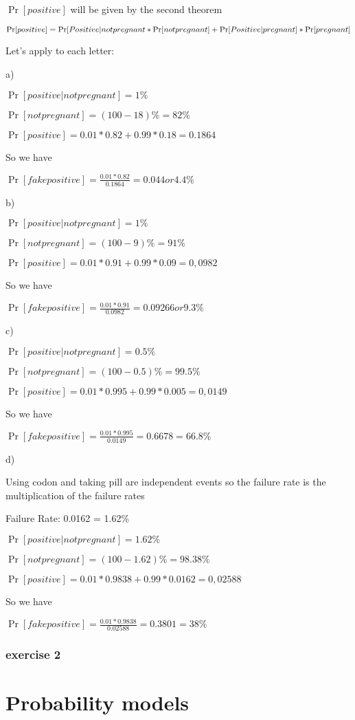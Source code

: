 \documentclass{book}
\begin{document}
$\Pr[positive]$ will be given by the second theorem

\begin{equation*}
\large{\Pr[positive]=\Pr[Positive|not pregnant}*\Pr[not pregnant]+\Pr[Positive|pregnant]*\Pr[pregnant]    
\end{equation*}

Let's apply to each letter:

a)

$\Pr[positive|not pregnant] = 1\%$

$\Pr[not pregnant]= (100-18)\%=82\%$

$\Pr[positive]=0.01*0.82+0.99*0.18=0.1864$

So we have

$\Pr[fake positive] = \frac{0.01*0.82}{0.1864}=0.044 or 4.4\%$


b)

$\Pr[positive|not pregnant] = 1\%$

$\Pr[not pregnant]= (100-9)\%=91\%$

$\Pr[positive]=0.01*0.91+0.99*0.09=0,0982$

So we have

$\Pr[fake positive] = \frac{0.01*0.91}{0.0982}=0.09266 or 9.3\%$

c)

$\Pr[positive|not pregnant] = 0.5\%$

$\Pr[not pregnant]= (100-0.5)\%=99.5\%$

$\Pr[positive]=0.01*0.995+0.99*0.005=0,0149$

So we have

$\Pr[fake positive] = \frac{0.01*0.995}{0.0149}=0.6678=66.8\%$

d)

Using codon and taking pill are independent events so the failure rate is the multiplication of the failure rates

Failure Rate: 0.0162 = 1.62\%

$\Pr[positive|not pregnant] = 1.62\%$

$\Pr[not pregnant]= (100-1.62)\%=98.38\%$

$\Pr[positive]=0.01*0.9838+0.99*0.0162=0,02588$

So we have

$\Pr[fake positive] = \frac{0.01*0.9838}{0.02588}=0.3801=38\%$

\subsubsection{exercise 2}


\section{Probability models}
\end{document}
